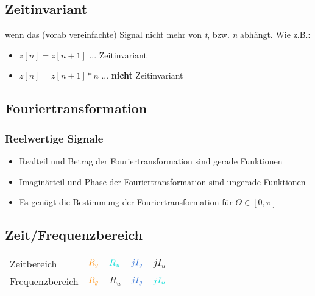 \documentclass[a4paper, 12pt]{article}
\begin{document}
\subsection{Zeitinvariant}
wenn das (vorab vereinfachte) Signal nicht mehr von \textit{t}, bzw. \textit{n} abhängt. Wie z.B.:
\begin{itemize}
  \item $z[n] = z[n+1]$ ... Zeitinvariant
  \item $z[n] = z[n+1]*n$ ... \textbf{nicht} Zeitinvariant
\end{itemize}

\subsection{Fouriertransformation}

\subsubsection{Reelwertige Signale}

\begin{itemize}
    \item Realteil und Betrag der Fouriertransformation sind gerade Funktionen
    \item Imaginärteil und Phase der Fouriertransformation sind ungerade Funktionen
    \item Es genügt die Bestimmung der Fouriertransformation für $Θ ∈ [0,π]$
\end{itemize}

\subsection{Zeit/Frequenzbereich}

\begin{tabular}{lllll}
    Zeitbereich &
    $\color{orange} R_g$  &
    $\color{turquoise} R_u$  &
    $\color{bluegray} jI_g$ &
    $jI_u$\\

    Frequenzbereich &
    $\color{orange} R_g$  &
    $R_u$  &
    $\color{bluegray}jI_g$ &
    $\color{turquoise}jI_u$\\
\end{tabular}
\end{document}
